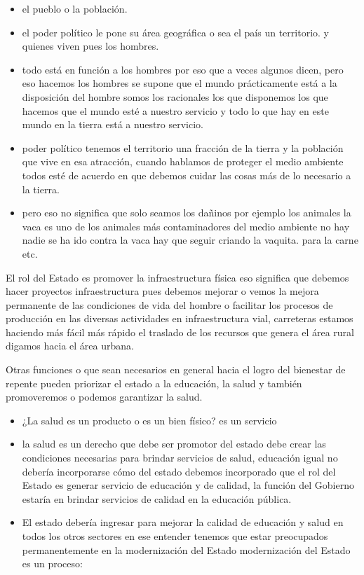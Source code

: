 \documentclass[
  jou,
  floatsintext,
  longtable,
  a4paper,
  nolmodern,
  notxfonts,
  notimes,
  12pt,
  colorlinks=true,linkcolor=blue,citecolor=blue,urlcolor=blue]{apa7}
\providecommand{\tightlist}{%
  \setlength{\itemsep}{0pt}\setlength{\parskip}{0pt}}
\begin{document}
\begin{itemize}
\tightlist
\item
  el pueblo o la población.
\item
  el poder político le pone su área geográfica o sea el país un
  territorio. y quienes viven pues los hombres.
\item
  todo está en función a los hombres por eso que a veces algunos dicen,
  pero eso hacemos los hombres se supone que el mundo prácticamente está
  a la disposición del hombre somos los racionales los que disponemos
  los que hacemos que el mundo esté a nuestro servicio y todo lo que hay
  en este mundo en la tierra está a nuestro servicio.
\item
  poder político tenemos el territorio una fracción de la tierra y la
  población que vive en esa atracción, cuando hablamos de proteger el
  medio ambiente todos esté de acuerdo en que debemos cuidar las cosas
  más de lo necesario a la tierra.
\item
  pero eso no significa que solo seamos los dañinos por ejemplo los
  animales la vaca es uno de los animales más contaminadores del medio
  ambiente no hay nadie se ha ido contra la vaca hay que seguir criando
  la vaquita. para la carne etc.
\end{itemize}

El rol del Estado es promover la infraestructura física eso significa
que debemos hacer proyectos infraestructura pues debemos mejorar o vemos
la mejora permanente de las condiciones de vida del hombre o facilitar
los procesos de producción en las diversas actividades en
infraestructura vial, carreteras estamos haciendo más fácil más rápido
el traslado de los recursos que genera el área rural digamos hacia el
área urbana.

Otras funciones o que sean necesarios en general hacia el logro del
bienestar de repente pueden priorizar el estado a la educación, la salud
y también promoveremos o podemos garantizar la salud.

\begin{itemize}
\tightlist
\item
  ¿La salud es un producto o es un bien físico? es un servicio
\item
  la salud es un derecho que debe ser promotor del estado debe crear las
  condiciones necesarias para brindar servicios de salud, educación
  igual no debería incorporarse cómo del estado debemos incorporado que
  el rol del Estado es generar servicio de educación y de calidad, la
  función del Gobierno estaría en brindar servicios de calidad en la
  educación pública.
\item
  El estado debería ingresar para mejorar la calidad de educación y
  salud en todos los otros sectores en ese entender tenemos que estar
  preocupados permanentemente en la modernización del Estado
  modernización del Estado es un proceso:
\end{itemize}
\end{document}
